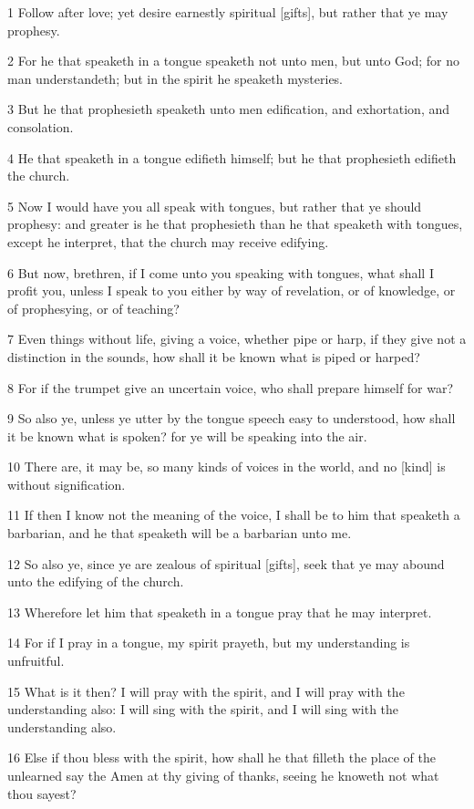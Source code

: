\par 1 Follow after love; yet desire earnestly spiritual [gifts], but rather that ye may prophesy.
\par 2 For he that speaketh in a tongue speaketh not unto men, but unto God; for no man understandeth; but in the spirit he speaketh mysteries.
\par 3 But he that prophesieth speaketh unto men edification, and exhortation, and consolation.
\par 4 He that speaketh in a tongue edifieth himself; but he that prophesieth edifieth the church.
\par 5 Now I would have you all speak with tongues, but rather that ye should prophesy: and greater is he that prophesieth than he that speaketh with tongues, except he interpret, that the church may receive edifying.
\par 6 But now, brethren, if I come unto you speaking with tongues, what shall I profit you, unless I speak to you either by way of revelation, or of knowledge, or of prophesying, or of teaching?
\par 7 Even things without life, giving a voice, whether pipe or harp, if they give not a distinction in the sounds, how shall it be known what is piped or harped?
\par 8 For if the trumpet give an uncertain voice, who shall prepare himself for war?
\par 9 So also ye, unless ye utter by the tongue speech easy to understood, how shall it be known what is spoken? for ye will be speaking into the air.
\par 10 There are, it may be, so many kinds of voices in the world, and no [kind] is without signification.
\par 11 If then I know not the meaning of the voice, I shall be to him that speaketh a barbarian, and he that speaketh will be a barbarian unto me.
\par 12 So also ye, since ye are zealous of spiritual [gifts], seek that ye may abound unto the edifying of the church.
\par 13 Wherefore let him that speaketh in a tongue pray that he may interpret.
\par 14 For if I pray in a tongue, my spirit prayeth, but my understanding is unfruitful.
\par 15 What is it then? I will pray with the spirit, and I will pray with the understanding also: I will sing with the spirit, and I will sing with the understanding also.
\par 16 Else if thou bless with the spirit, how shall he that filleth the place of the unlearned say the Amen at thy giving of thanks, seeing he knoweth not what thou sayest?
